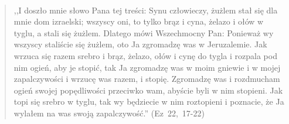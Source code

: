 \documentclass[10pt,a4paper,oneside]{article}
\begin{document}
\paragraph{}
\begin{quote}
,,I doszło mnie słowo Pana tej treści: Synu człowieczy, żużlem stał się dla mnie dom izraelski; wszyscy oni, to tylko brąz i cyna, żelazo i ołów w tyglu, a stali się żużlem. Dlatego mówi Wszechmocny Pan: Ponieważ wy wszyscy staliście się żużlem, oto Ja zgromadzę was w Jeruzalemie. Jak wrzuca się razem srebro i brąz, żelazo, ołów i cynę do tygla i rozpala pod nim ogień, aby je stopić, tak Ja zgromadzę was w moim gniewie i w mojej zapalczywości i wrzucę was razem, i stopię. Zgromadzę was i rozdmucham ogień swojej popędliwości przeciwko wam, abyście byli w nim stopieni. Jak topi się srebro w tyglu, tak wy będziecie w nim roztopieni i poznacie, że Ja wylałem na was swoją zapalczywość.'' \mbox{(Ez 22, 17-22)}
\end{quote}
\end{document}
